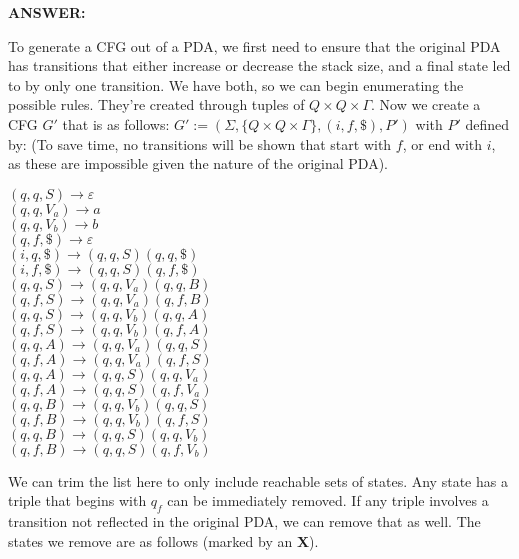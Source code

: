 \documentclass{article}
\begin{document}
\textbf{ANSWER:}

To generate a CFG out of a PDA, we first need to ensure that the original PDA has transitions that either increase or decrease the stack size, and a final state led to by only one transition. We have both, so we can begin enumerating the possible rules. They're created through tuples of $Q \times Q \times \Gamma$. Now we create a CFG $G'$ that is as follows: $G' := (\Sigma, \{Q \times Q \times \Gamma\}, (i, f, \$), P')$ with $P'$ defined by: (To save time, no transitions will be shown that start with $f$, or end with $i$, as these are impossible given the nature of the original PDA).

\begin{center}
	$(q, q, S) \rightarrow \varepsilon$ \\
	$(q, q, V_a) \rightarrow a$ \\
	$(q, q, V_b) \rightarrow b$ \\
	$(q, f, \$) \rightarrow \varepsilon$ \\
	\hfill \break
	$(i, q, \$) \rightarrow (q, q, S)(q, q, \$)$ \\ 
	$(i, f, \$) \rightarrow (q, q, S)(q, f, \$)$ \\
	\hfill \break
	$(q, q, S) \rightarrow (q, q, V_a)(q, q, B)$ \\
	$(q, f, S) \rightarrow (q, q, V_a)(q, f, B)$ \\

	\hfill \break
	$(q, q, S) \rightarrow (q, q, V_b)(q, q, A)$ \\
	$(q, f, S) \rightarrow (q, q, V_b)(q, f, A)$ \\
	\hfill \break
	$(q, q, A) \rightarrow (q, q, V_a)(q, q, S)$ \\
	$(q, f, A) \rightarrow (q, q, V_a)(q, f, S)$ \\
	\hfill \break
	$(q, q, A) \rightarrow (q, q, S)(q, q, V_a)$ \\
	$(q, f, A) \rightarrow (q, q, S)(q, f, V_a)$ \\
	\hfill \break
	$(q, q, B) \rightarrow (q, q, V_b)(q, q, S)$ \\
	$(q, f, B) \rightarrow (q, q, V_b)(q, f, S)$ \\
	\hfill \break
	$(q, q, B) \rightarrow (q, q, S)(q, q, V_b)$ \\
	$(q, f, B) \rightarrow (q, q, S)(q, f, V_b)$ \\
\end{center}

We can trim the list here to only include reachable sets of states. Any state has a triple that begins with $q_f$ can be immediately removed. If any triple involves a transition not reflected in the original PDA, we can remove that as well. The states we remove are as follows (marked by an \textbf{X}). 
\end{document}
